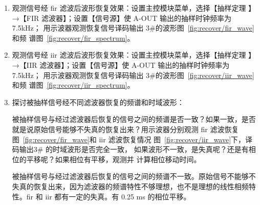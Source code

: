 \documentclass[../main]{subfiles}
\begin{document}
  \begin{enumerate}
    \item 观测信号经 fir 滤波后波形恢复效果：设置主控模块菜单，选择【抽样定理
      】→【FIR 滤波器】；设置【信号源】使 A-OUT 输出的抽样时钟频率为 7.5kHz；
      用示波器观测恢复信号译码输出 3\#的波形图~\ref{fig:recover/fir_wave}和频
      谱图~\ref{fig:recover/fir_spectrum}。
    \item 观测信号经 iir 滤波后波形恢复效果：设置主控模块菜单，选择【抽样定理
      】→【IIR 滤波器】；设置【信号源】使 A-OUT 输出的抽样时钟频率为 7.5kHz；
      用示波器观测恢复信号译码输出 3\#的波形图~\ref{fig:recover/iir_wave}和频
      谱图~\ref{fig:recover/iir_spectrum}。
    \item 探讨被抽样信号经不同滤波器恢复的频谱和时域波形：

      \begin{Exercise}[title = 思考]
        被抽样信号与经过滤波器后恢复的信号之间的频谱是否一致？如果一致，是否
        就是说原始信号能够不失真的恢复出来？用示波器分别观测 fir 滤波恢复
        图~\ref{fig:recover/fir_wave}和 iir 滤波恢复情况
        图~\ref{fig:recover/iir_wave}下，译码输出3\# 的时域波形是否完全一致，
        如果波形不一致，是失真呢？还是有相位的平移呢？如果相位有平移，观测并
        计算相位移动时间。
      \end{Exercise}

      \begin{Answer}
        被抽样信号与经过滤波器后恢复的信号之间的频谱不一致。原始信号不能够不
        失真的恢复出来，因为滤波器的频谱特性不够理想，也不是理想的线性相频特
        性。fir 和 iir 都有一定的失真。有 0.25 ms 的相位平移。
      \end{Answer}
  \end{enumerate}
\end{document}
